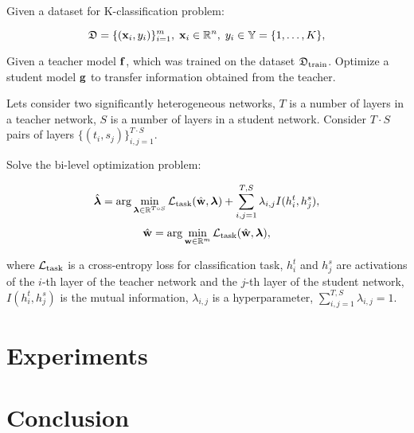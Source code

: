 \documentclass[runningheads]{llncs}
\begin{document}
Given a dataset for K-classification problem:

$$\mathfrak{D} = \{(\mathbf{x}_i, y_i)\}_{i=1}^{m},\; \mathbf{x}_i \in \mathbb{R}^n,\; y_i \in \mathbb{Y} = \{1, \dots, K\},$$


Given a teacher model $\mathbf{f}$, which was trained on the dataset $\mathfrak{D}_\text{train}$. Optimize a student model $\mathbf{g}$ to transfer information obtained from  the teacher.

Lets consider two significantly heterogeneous networks, 
$T$ is a number of layers in a teacher network, $S$ is a number of layers in a student network. Consider $T \cdot S$ pairs of layers $\{(t_i, s_j)\}_{i, j=1}^{T \cdot S}.$

Solve the bi-level optimization problem:



$$
\hat{\boldsymbol{\lambda}} = \arg\min\limits_{\boldsymbol{\lambda} \in \mathbb{R}^{T \circ S}} \mathcal{L}_{\text{task}}(\hat{\mathbf{w}}, \boldsymbol{\lambda}) + {\sum_{i, j=1}^{T, S}\lambda_{i, j}I(h^{t}_{i}, h^{s}_{j})},
$$ 
$$
\hat{\mathbf{w}} = \arg\min\limits_{\mathbf{w} \in \mathbb{R}^m} \mathcal{L}_{\text{task}}(\hat{\mathbf{w}}, \boldsymbol{\lambda}),$$

\noindent
where $\mathcal{L}_{\text{task}}$ is a cross-entropy loss for classification task, $h^{t}_{i}$ and $h^{s}_{j}$ are activations of the $i$-th layer of the teacher network and the $j$-th layer of the student network, $I(h^{t}_{i}, h^{s}_{j})$ is the mutual information, $\lambda_{i, j}$ is a hyperparameter, $\sum_{i, j = 1}^{T, S}\lambda_{i, j} = 1$.



\section{Experiments}



\section{Conclusion}


\end{document}
